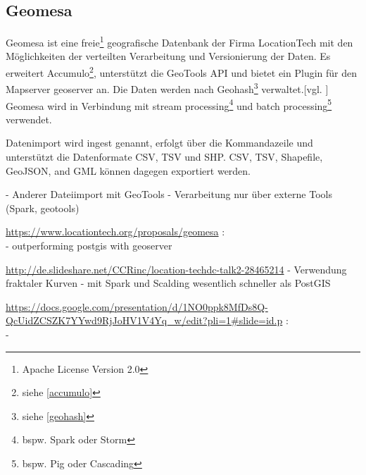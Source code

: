 \subsection{Geomesa}

Geomesa ist eine freie\footnote{Apache License Version 2.0} geografische Datenbank der Firma LocationTech mit den Möglichkeiten der verteilten Verarbeitung und Versionierung der Daten.
Es erweitert Accumulo\footnote{siehe \ref{accumulo}},  unterstützt die GeoTools API und bietet ein Plugin für den Mapserver \Gls{geoserver} an.
Die Daten werden nach Geohash\footnote{siehe \ref{geohash}} verwaltet.[vgl. \cite{website:geomesaeclipse}]\\
Geomesa wird in Verbindung mit stream processing\footnote{bspw. Spark oder Storm} und batch processing\footnote{bspw. Pig oder Cascading} verwendet.

Datenimport wird ingest genannt, erfolgt über die Kommandazeile und unterstützt die Datenformate CSV, TSV und SHP.
CSV, TSV, Shapefile, GeoJSON, and GML können dagegen exportiert werden.


- Anderer Dateiimport mit GeoTools
- Verarbeitung nur über externe Tools (Spark, geotools)


\url{https://www.locationtech.org/proposals/geomesa} :\\
- outperforming postgis with geoserver


\url{http://de.slideshare.net/CCRinc/location-techdc-talk2-28465214}
- Verwendung fraktaler Kurven
- mit Spark und Scalding wesentlich schneller als PostGIS


\url{https://docs.google.com/presentation/d/1NO0ppk8MfDs8Q-QcUidZCSZK7YYwd9RjJoHV1V4Yq_w/edit?pli=1#slide=id.p} :\\
- 





